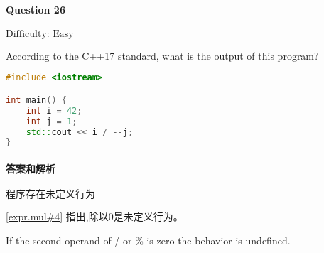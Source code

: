 \documentclass{article}
\begin{document}
	\paragraph*{Question 26}\noindent $\boxed{\text{Difficulty: Easy}} $
	
	According to the C++17 standard, what is the output of this program? 
	
	\begin{lstlisting}[language=C++]    
#include <iostream>

int main() {
	int i = 42;
	int j = 1;
	std::cout << i / --j;
}
	\end{lstlisting}
	
	\paragraph*{答案和解析} $\boxed{\text{程序存在未定义行为}} $
	
	\href{https://timsong-cpp.github.io/cppwp/n4659/expr.mul#4}{[expr.mul\#4]} 指出,除以0是未定义行为。
	\begin{lightgrayleftbar}
		If the second operand of / or \% is zero the behavior is undefined.
	\end{lightgrayleftbar}
	
	
\end{document}
